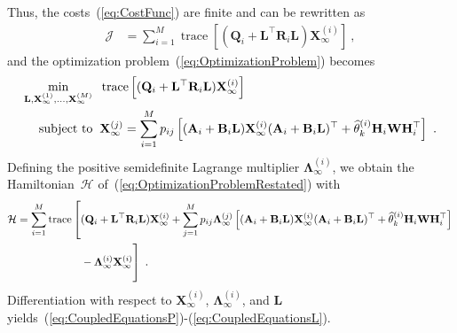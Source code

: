 \documentclass[preprint,1p,11pt]{IR-Template/ISAS_IR}
\newcommand{\mat}[1]{{\ensuremath{{\mathbf{#1}}}}}
\newcommand{\tr}{^{\top}}
\DeclareMathOperator{\ttrace}{trace}
\newcommand{\trace}[1]{\ttrace\bklammer{#1}}
\DeclareMathOperator{\st}{subject\ to}
\newcommand{\bklammer}[1]{\left[ #1 \right]}
\newcommand{\Asys}[1]{\mat{A}_{#1}}
\newcommand{\Bsys}[1]{\mat{B}_{#1}}
\newcommand{\Qsys}[1]{\mat{Q}_{#1}}
\newcommand{\Rsys}[1]{\mat{R}_{#1}}
\newcommand{\Hsys}[1]{\mat{H}_{#1}}
\newcommand{\wCov}{\mat{W}}
\newcommand{\modeest}[2]{\widehat{\theta}^{(#1)}_{#2}}
\newcommand{\transitionprob}[1]{p_{#1}}
\newcommand{\Xsysest}[2]{\mat{X}^{(#1)}_{#2}}
\newcommand{\ControlLaw}{\mat{L}}
\newcommand{\NumModes}{M}
\newcommand{\CostFunc}{\mathcal{J}}
\newcommand{\Lagrange}[2]{\mat{\Lambda}^{(#1)}_{#2}}
\newcommand{\Hamiltonian}{\mathcal{H}}
\begin{document}
Thus, the costs~(\ref{eq:CostFunc}) are finite and can be rewritten as~
\begin{align*}
\CostFunc
	&=
	\sum\limits_{i=1}^{\NumModes} \trace{(\Qsys{i}+\ControlLaw\tr\Rsys{i}\ControlLaw)\Xsysest{i}{\infty}}\ ,
\end{align*}
and the optimization problem~(\ref{eq:OptimizationProblem}) becomes
\begin{align}
\begin{aligned}
\min\limits_{\ControlLaw,\Xsysest{1}{\infty},\dots,\Xsysest{\NumModes}{\infty}}&\hspace{2mm} \trace{(\Qsys{i}+\ControlLaw\tr\Rsys{i}\ControlLaw)\Xsysest{i}{\infty}}\\
\st&\hspace{2mm}
	\Xsysest{j}{\infty}
		=
		\sum\limits_{i=1}^{\NumModes}\transitionprob{ij} \bklammer{(\Asys{i}+\Bsys{i}\ControlLaw)\Xsysest{i}{\infty} (\Asys{i}+\Bsys{i}\ControlLaw)\tr + \modeest{i}{k}\Hsys{i}\wCov\Hsys{i}\tr}\ .
\end{aligned}
\label{eq:OptimizationProblemRestated}
\end{align}
Defining the positive semidefinite Lagrange multiplier $\Lagrange{i}{\infty}$, we obtain the Hamiltonian~$\Hamiltonian$ of~(\ref{eq:OptimizationProblemRestated}) with
\begin{align*}
\Hamiltonian
	&=
	\sum\limits_{i=1}^{\NumModes} \trace{(\Qsys{i}+\ControlLaw\tr\Rsys{i}\ControlLaw)\Xsysest{i}{\infty} + \sum\limits_{j=1}^{\NumModes}\transitionprob{ij}\Lagrange{j}{\infty}\bklammer{(\Asys{i}+\Bsys{i}\ControlLaw)\Xsysest{i}{\infty}(\Asys{i}+\Bsys{i}\ControlLaw)\tr + \modeest{i}{k}\Hsys{i}\wCov\Hsys{i}\tr}\right.\\
	&\left. \vphantom{\sum\limits_{j=1}^{\NumModes}}
	\hspace{2cm}- \Lagrange{i}{\infty}\Xsysest{i}{\infty}}\ .
\end{align*}
Differentiation with respect to $\Xsysest{i}{\infty}$, $\Lagrange{i}{\infty}$, and $\ControlLaw$ yields~(\ref{eq:CoupledEquationsP})-(\ref{eq:CoupledEquationsL}).


    	
\end{document}
